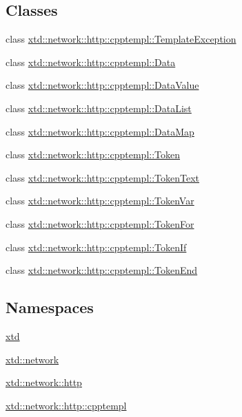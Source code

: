 \subsection*{Classes}
\begin{DoxyCompactItemize}
\item 
class \hyperlink{classxtd_1_1network_1_1http_1_1cpptempl_1_1TemplateException}{xtd\-::network\-::http\-::cpptempl\-::\-Template\-Exception}
\item 
class \hyperlink{classxtd_1_1network_1_1http_1_1cpptempl_1_1Data}{xtd\-::network\-::http\-::cpptempl\-::\-Data}
\item 
class \hyperlink{classxtd_1_1network_1_1http_1_1cpptempl_1_1DataValue}{xtd\-::network\-::http\-::cpptempl\-::\-Data\-Value}
\item 
class \hyperlink{classxtd_1_1network_1_1http_1_1cpptempl_1_1DataList}{xtd\-::network\-::http\-::cpptempl\-::\-Data\-List}
\item 
class \hyperlink{classxtd_1_1network_1_1http_1_1cpptempl_1_1DataMap}{xtd\-::network\-::http\-::cpptempl\-::\-Data\-Map}
\item 
class \hyperlink{classxtd_1_1network_1_1http_1_1cpptempl_1_1Token}{xtd\-::network\-::http\-::cpptempl\-::\-Token}
\item 
class \hyperlink{classxtd_1_1network_1_1http_1_1cpptempl_1_1TokenText}{xtd\-::network\-::http\-::cpptempl\-::\-Token\-Text}
\item 
class \hyperlink{classxtd_1_1network_1_1http_1_1cpptempl_1_1TokenVar}{xtd\-::network\-::http\-::cpptempl\-::\-Token\-Var}
\item 
class \hyperlink{classxtd_1_1network_1_1http_1_1cpptempl_1_1TokenFor}{xtd\-::network\-::http\-::cpptempl\-::\-Token\-For}
\item 
class \hyperlink{classxtd_1_1network_1_1http_1_1cpptempl_1_1TokenIf}{xtd\-::network\-::http\-::cpptempl\-::\-Token\-If}
\item 
class \hyperlink{classxtd_1_1network_1_1http_1_1cpptempl_1_1TokenEnd}{xtd\-::network\-::http\-::cpptempl\-::\-Token\-End}
\end{DoxyCompactItemize}
\subsection*{Namespaces}
\begin{DoxyCompactItemize}
\item 
\hyperlink{namespacextd}{xtd}
\item 
\hyperlink{namespacextd_1_1network}{xtd\-::network}
\item 
\hyperlink{namespacextd_1_1network_1_1http}{xtd\-::network\-::http}
\item 
\hyperlink{namespacextd_1_1network_1_1http_1_1cpptempl}{xtd\-::network\-::http\-::cpptempl}
\end{DoxyCompactItemize}
